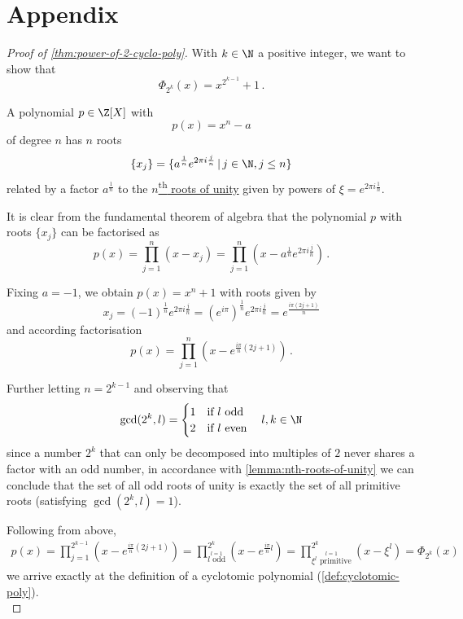 \chapter*{Appendix}
\label{chap:appendix}

\begin{proof}[Proof of \autoref{thm:power-of-2-cyclo-poly}]
  With $k \in \N$ a positive integer, we want to show that
  $$\Phi_{2^k} (x) = x^{2^{k-1}} + 1\,.$$

  A polynomial $p \in \Z[X]$ with $$p(x) = x^n - a$$ of degree $n$ has $n$ roots
  $$\{x_j\} = \{a^\frac{1}{n} e^{2\pi i \frac{j}{n}} \,|\, j \in \N, j \leq n\}$$
  related by a factor $a^\frac{1}{n}$ to the
  \hyperref[lemma:nth-roots-of-unity]{$n$\textsuperscript{th} roots of unity} given by powers of
  $\xi = e^{2\pi i \frac{1}{n}}$.

  It is clear from the fundamental theorem of algebra that the polynomial $p$ with roots $\{x_j\}$
  can be factorised as
  $$p(x) = \prod_{j=1}^{n} (x - x_j) = \prod_{j=1}^{n} (x - a^\frac{1}{n} e^{2\pi i \frac{j}{n}})\,.$$

  Fixing $a = -1$, we obtain $p(x) = x^n + 1$ with roots given by
  $$x_j = (-1)^\frac{1}{n} e^{2\pi i \frac{j}{n}}
    = (e^{i\pi})^\frac{1}{n} e^{2\pi i \frac{j}{n}}
    = e^{\frac{i\pi (2j + 1)}{n}}$$
  and according factorisation
  $$p(x) = \prod_{j=1}^{n} (x - e^{\frac{i\pi}{n} (2j + 1)})\,.$$

  Further letting $n = 2^{k-1}$ and observing that
  $$\gcd(2^k, l) = \begin{cases}
      1 & \text{if } l \text{ odd}  \\
      2 & \text{if } l \text{ even}
    \end{cases} \quad l, k \in \N$$
  since a number $2^k$ that can only be decomposed into multiples of $2$
  never shares a factor with an odd number, in accordance with \autoref{lemma:nth-roots-of-unity}
  we can conclude that the set of all odd roots of unity is exactly the set of all primitive roots
  (satisfying $\gcd(2^k, l) = 1$).

  Following from above,
  \begin{align*}
    p(x) = \prod_{j=1}^{2^{k-1}} (x - e^{\frac{i\pi}{n} (2j + 1)})
    = \prod_{\stackrel{l=1}{l \text{ odd}}}^{2^k} (x - e^{\frac{i\pi}{n} l})
    = \prod_{\stackrel{l=1}{\xi^l \text{ primitive}}}^{2^k} (x - \xi^l)
    = \Phi_{2^k}(x)
  \end{align*}
  we arrive exactly at the definition of a cyclotomic polynomial (\autoref{def:cyclotomic-poly}). \\
  \parencite{power-of-2-cyclo-poly}
\end{proof}
